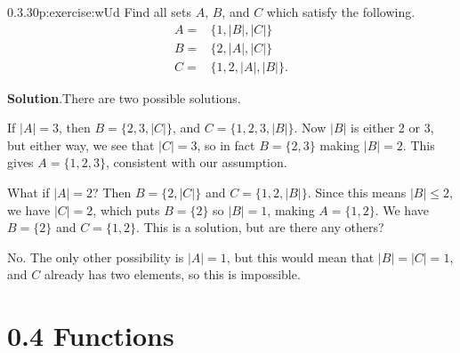 \documentclass[twoside,11pt,]{book}
\newcommand{\blocktitlefont}{\relax}
\numberwithin{equation}{chapter}
\newcommand{\card}[1]{\left| #1 \right|}
\newcommand{\amp}{&}
\begin{document}
\begin{divisionsolution}{0.3.30}{}{p:exercise:wUd}%
Find all sets \(A\), \(B\), and \(C\) which satisfy the following.%
\begin{align*}
A = \amp \{1, \card{B}, \card{C}\}\\
B = \amp \{2, \card{A}, \card{C}\}\\
C = \amp \{1, 2, \card{A}, \card{B}\}\text{.}
\end{align*}
%
\par\smallskip%
\noindent\textbf{\blocktitlefont Solution}.\quad{}There are two possible solutions.%
\par
If \(\card{A} = 3\), then \(B = \{2, 3, \card{C}\}\), and \(C = \{1, 2, 3, \card{B}\}\).  Now \(|B|\) is either 2 or 3, but either way, we see that \(|C| = 3\), so in fact \(B = \{2,3\}\) making \(|B| = 2\).  This gives \(A = \{1, 2, 3\}\), consistent with our assumption.%
\par
What if \(\card{A} = 2\)?  Then \(B = \{2, \card{C}\}\) and \(C = \{1, 2, \card{B}\}\).  Since this means \(\card{B} \le 2\), we have \(\card{C} = 2\), which puts \(B = \{2\}\) so \(\card{B} = 1\), making \(A = \{1, 2\}\). We have \(B = \{2\}\) and \(C = \{1, 2\}\).  This is a solution, but are there any others?%
\par
No.  The only other possibility is \(\card{A} = 1\), but this would mean that \(\card{B} = \card{C} = 1\), and \(C\) already has two elements, so this is impossible.%
\end{divisionsolution}%
\section*{0.4 Functions}
\end{document}
